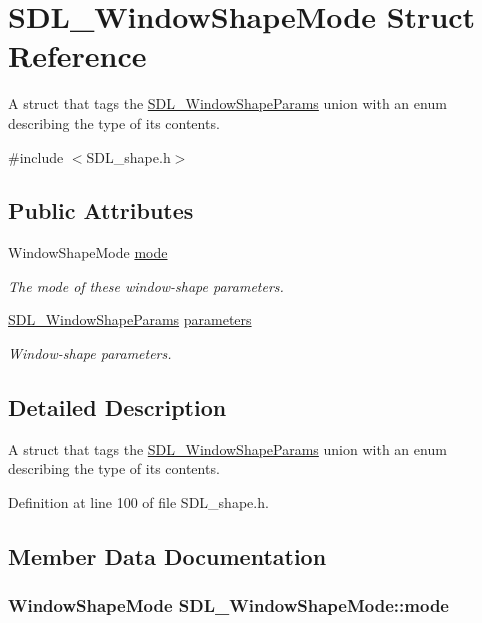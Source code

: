 \hypertarget{structSDL__WindowShapeMode}{\section{S\+D\+L\+\_\+\+Window\+Shape\+Mode Struct Reference}
\label{structSDL__WindowShapeMode}
}


A struct that tags the \hyperlink{unionSDL__WindowShapeParams}{S\+D\+L\+\_\+\+Window\+Shape\+Params} union with an enum describing the type of its contents.  




{\ttfamily \#include $<$S\+D\+L\+\_\+shape.\+h$>$}

\subsection*{Public Attributes}
\begin{DoxyCompactItemize}
\item 
Window\+Shape\+Mode \hyperlink{structSDL__WindowShapeMode_a40ebd8b9a76d982cbd87563386cc05de}{mode}
\begin{DoxyCompactList}\small\item\em The mode of these window-\/shape parameters. \end{DoxyCompactList}\item 
\hyperlink{unionSDL__WindowShapeParams}{S\+D\+L\+\_\+\+Window\+Shape\+Params} \hyperlink{structSDL__WindowShapeMode_a2f79bb294034156207fa6d88d3a8c819}{parameters}
\begin{DoxyCompactList}\small\item\em Window-\/shape parameters. \end{DoxyCompactList}\end{DoxyCompactItemize}


\subsection{Detailed Description}
A struct that tags the \hyperlink{unionSDL__WindowShapeParams}{S\+D\+L\+\_\+\+Window\+Shape\+Params} union with an enum describing the type of its contents. 

Definition at line 100 of file S\+D\+L\+\_\+shape.\+h.



\subsection{Member Data Documentation}
\hypertarget{structSDL__WindowShapeMode_a40ebd8b9a76d982cbd87563386cc05de}{
\subsubsection[{mode}]{\setlength{\rightskip}{0pt plus 5cm}Window\+Shape\+Mode S\+D\+L\+\_\+\+Window\+Shape\+Mode\+::mode}}\label{structSDL__WindowShapeMode_a40ebd8b9a76d982cbd87563386cc05de}


